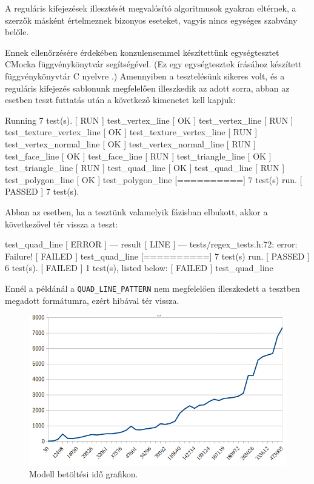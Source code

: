 

A reguláris kifejezések illesztését megvalósító algoritmusok gyakran eltérnek, a szerzők másként értelmeznek bizonyos eseteket, vagyis nincs egységes szabvány belőle.

Ennek ellenőrzésére érdekében konzulensemmel készítettünk egységtesztet CMocka függvénykönytvár segítségével. (Ez egy egységtesztek írásához készített függvénykönyvtár C nyelvre \cite{andreas2014cmocka}.) Amennyiben a tesztelésünk sikeres volt, és a reguláris kifejezés sablonunk megfelelően illeszkedik az adott sorra, abban az esetben teszt futtatás után a következő kimenetet kell kapjuk:
\begin{python}
[==========] Running 7 test(s).
[ RUN      ] test_vertex_line
[       OK ] test_vertex_line
[ RUN      ] test_texture_vertex_line
[       OK ] test_texture_vertex_line
[ RUN      ] test_vertex_normal_line
[       OK ] test_vertex_normal_line
[ RUN      ] test_face_line
[       OK ] test_face_line
[ RUN      ] test_triangle_line
[       OK ] test_triangle_line
[ RUN      ] test_quad_line
[       OK ] test_quad_line
[ RUN      ] test_polygon_line
[       OK ] test_polygon_line
[==========] 7 test(s) run.
[  PASSED  ] 7 test(s).
\end{python}
Abban az esetben, ha a tesztünk valamelyik fázisban elbukott, akkor a következővel tér vissza a teszt:
\begin{python}
[ RUN      ] test_quad_line
[  ERROR   ] --- result
[   LINE   ] --- tests/regex_tests.h:72: error: Failure!
[  FAILED  ] test_quad_line
[==========] 7 test(s) run.
[  PASSED  ] 6 test(s).
[  FAILED  ] 1 test(s), listed below:
[  FAILED  ] test_quad_line
\end{python}
Ennél a példánál a \texttt{QUAD\_LINE\_PATTERN} nem megfelelően illeszkedett  a tesztben megadott formátumra, ezért hibával tér vissza.


\begin{figure}[h]
\centering
\includegraphics[width=\textwidth]{images/betoltesiido.png}
\caption{Modell betöltési idő grafikon.}
\label{fig:betolt}
\end{figure}


